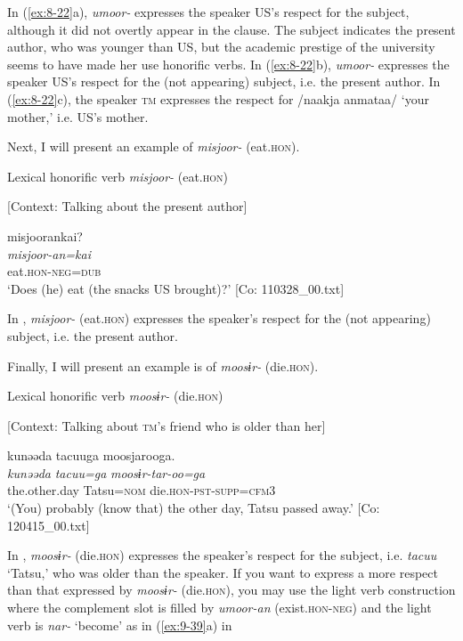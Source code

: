 In (\ref{ex:8-22}a), \textit{umoor-} expresses the speaker US’s respect for the subject, although it did not overtly appear in the clause. The subject indicates the present author, who was younger than US, but the academic prestige of the university seems to have made her use honorific verbs. In (\ref{ex:8-22}b), \textit{umoor-} expresses the speaker US’s respect for the (not appearing) subject, i.e. the present author. In (\ref{ex:8-22}c), the speaker \textsc{tm} expresses the respect for /naakja anmataa/ ‘your mother,’ i.e. US’s mother.

Next, I will present an example of \textit{misjoor-} (eat.\textsc{hon}).

\ea\label{ex:8-23}
  Lexical honorific verb \textit{misjoor-} (eat.\textsc{hon})

  [Context: Talking about the present author]

 {\US}
\glll   misjoorankai?\\
\textit{misjoor-an=kai}\\
    eat.\textsc{hon}-\textsc{neg}=\textsc{dub}\\
\glt ‘Does (he) eat (the snacks US brought)?’ [Co: 110328\_00.txt]
\z

In , \textit{misjoor-} (eat.\textsc{hon}) expresses the speaker’s respect for the (not appearing) subject, i.e. the present author.

  Finally, I will present an example is of \textit{moosɨr-} (die.\textsc{hon}).

\ea\label{ex:8-24}
  Lexical honorific verb \textit{moosɨr-} (die.\textsc{hon})

  [Context: Talking about \textsc{tm}’s friend who is older than her]

  {\TM}
\glll  kunəəda  tacuuga  moosjarooga.\\
\textit{kunəəda}  \textit{tacuu=ga}  \textit{moosɨr-tar-oo=ga}\\
    the.other.day  Tatsu=\textsc{nom}  die.\textsc{hon}-\textsc{pst}-\textsc{supp}=\textsc{cfm3}\\
\glt ‘(You) probably (know that) the other day, Tatsu passed away.’ [Co: 120415\_00.txt]
\z

In , \textit{moosɨr-} (die.\textsc{hon}) expresses the speaker’s respect for the subject, i.e. \textit{tacuu} ‘Tatsu,’ who was older than the speaker. If you want to express a more respect than that expressed by \textit{moosɨr-} (die.\textsc{hon}), you may use the light verb construction where the complement slot is filled by \textit{umoor-an} (exist.\textsc{hon}-\textsc{neg}) and the light verb is \textit{nar-} ‘become’ as in (\ref{ex:9-39}a) in 

